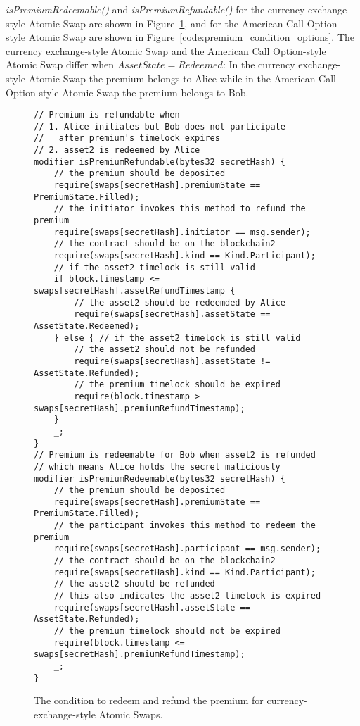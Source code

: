 \textit{isPremiumRedeemable()} and \textit{isPremiumRefundable()} for the currency exchange-style Atomic Swap are shown in Figure~\ref{code:premium_condition_currency}, and for the American Call Option-style Atomic Swap are shown in Figure~\ref{code:premium_condition_options}.
The currency exchange-style Atomic Swap and the American Call Option-style Atomic Swap differ when $AssetState = Redeemed$:
In the currency exchange-style Atomic Swap the premium belongs to Alice while in the American Call Option-style Atomic Swap the premium belongs to Bob.

\begin{figure}
\begin{lstlisting}[language=Solidity, basicstyle=\tiny]
// Premium is refundable when
// 1. Alice initiates but Bob does not participate
//   after premium's timelock expires
// 2. asset2 is redeemed by Alice
modifier isPremiumRefundable(bytes32 secretHash) {
    // the premium should be deposited
    require(swaps[secretHash].premiumState == PremiumState.Filled);
    // the initiator invokes this method to refund the premium
    require(swaps[secretHash].initiator == msg.sender);
    // the contract should be on the blockchain2
    require(swaps[secretHash].kind == Kind.Participant);
    // if the asset2 timelock is still valid
    if block.timestamp <= swaps[secretHash].assetRefundTimestamp {
        // the asset2 should be redeemded by Alice
        require(swaps[secretHash].assetState == AssetState.Redeemed);
    } else { // if the asset2 timelock is still valid
        // the asset2 should not be refunded
        require(swaps[secretHash].assetState != AssetState.Refunded);
        // the premium timelock should be expired
        require(block.timestamp > swaps[secretHash].premiumRefundTimestamp);
    }
    _;
}
// Premium is redeemable for Bob when asset2 is refunded
// which means Alice holds the secret maliciously
modifier isPremiumRedeemable(bytes32 secretHash) {
    // the premium should be deposited
    require(swaps[secretHash].premiumState == PremiumState.Filled);
    // the participant invokes this method to redeem the premium
    require(swaps[secretHash].participant == msg.sender);
    // the contract should be on the blockchain2
    require(swaps[secretHash].kind == Kind.Participant);
    // the asset2 should be refunded
    // this also indicates the asset2 timelock is expired
    require(swaps[secretHash].assetState == AssetState.Refunded);
    // the premium timelock should not be expired
    require(block.timestamp <= swaps[secretHash].premiumRefundTimestamp);
    _;
}
\end{lstlisting}
\label{code:premium_condition_currency}
\caption{The condition to redeem and refund the premium for currency-exchange-style Atomic Swaps.}
\end{figure}

